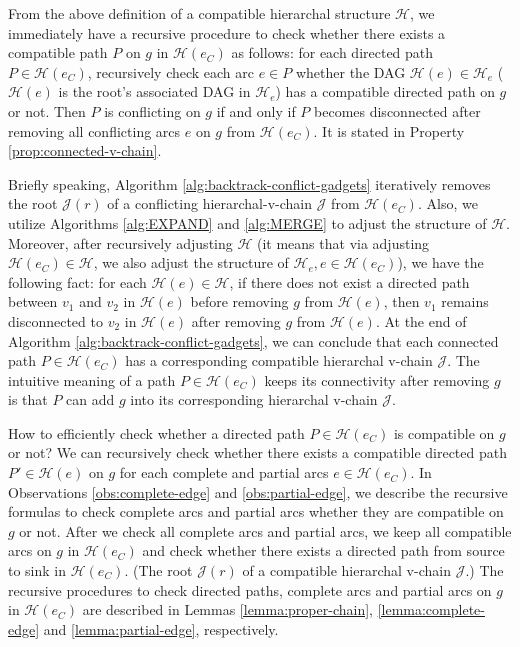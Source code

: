 \documentclass[11pt]{article}
\newcommand{\HH}{\mathcal{H}}
\newcommand{\JJ}{\mathcal{J}}
\begin{document}
From the above definition of a compatible hierarchal structure $\HH$,
we immediately have a recursive procedure to check whether
there exists a compatible path $P$ on $g$ in $\HH(e_C)$ as follows:
for each directed path $P\in \HH(e_C)$,
recursively check each arc $e\in P$ whether the DAG $\HH(e)\in \HH_e$
($\HH(e)$ is the root's associated DAG in $\HH_e$)
has a compatible directed path on $g$ or not.
Then $P$ is conflicting on $g$ if and only if $P$ becomes disconnected
after removing all conflicting arcs $e$ on $g$ from $\HH(e_C)$.
It is stated in Property \ref{prop:connected-v-chain}.


Briefly speaking, Algorithm \ref{alg:backtrack-conflict-gadgets} iteratively
removes the root $\JJ(r)$ of a conflicting hierarchal-v-chain $\JJ$ from $\HH(e_C)$.
Also, we utilize Algorithms \ref{alg:EXPAND} and
\ref{alg:MERGE} to adjust the structure of $\HH$.
Moreover, after recursively adjusting $\HH$
(it means that via adjusting $\HH(e_C)\in \HH$, we also
adjust the structure of $\HH_e, e\in \HH(e_C)$), we have the following fact:
for each $\HH(e)\in \HH$, if there does not exist
a directed path between $v_1$ and $v_2$ in $\HH(e)$ before removing $g$ from $\HH(e)$,
then $v_1$ remains disconnected to $v_2$ in $\HH(e)$ after removing $g$ from $\HH(e)$.
At the end of Algorithm \ref{alg:backtrack-conflict-gadgets},
we can conclude that
each connected path $P\in \HH(e_C)$
has a corresponding compatible hierarchal v-chain $\JJ$.
The intuitive meaning of a path $P\in \HH(e_C)$
keeps its connectivity after removing $g$
is that
$P$ can add $g$ into its corresponding hierarchal v-chain $\JJ$.

How to efficiently
check whether a directed path $P \in \HH(e_C)$ is compatible on $g$ or not?
We can recursively
check whether there exists a compatible directed path $P'\in \HH(e)$ on $g$
for each complete and partial arcs $e\in \HH(e_C)$.
In Observations \ref{obs:complete-edge} and \ref{obs:partial-edge},
we describe the recursive formulas to
check complete arcs and partial arcs
whether they are compatible on $g$ or not.
After we check all complete arcs and partial arcs,
we keep all compatible arcs on $g$ in $\HH(e_C)$ and
check whether there exists a directed path
from source to sink in $\HH(e_C)$.
(The root $\JJ(r)$ of a compatible hierarchal v-chain $\JJ$.)
The recursive procedures to check
directed paths, complete arcs and partial arcs on $g$ in $\HH(e_C)$
are described
in Lemmas \ref{lemma:proper-chain}, \ref{lemma:complete-edge} and \ref{lemma:partial-edge},
respectively.
\end{document}

